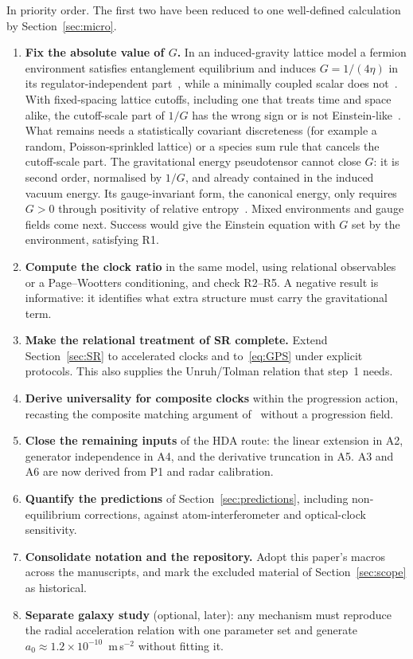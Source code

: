 \documentclass[11pt]{article}
\theoremstyle{plain}
\theoremstyle{definition}
\theoremstyle{remark}
\begin{document}
In priority order. The first two have been reduced to one well-defined calculation by Section~\ref{sec:micro}.

\begin{enumerate}[1.]
\item \textbf{Fix the absolute value of $G$.} In an induced-gravity lattice model a fermion environment satisfies entanglement equilibrium and induces $G=1/(4\eta)$ in its regulator-independent part~\cite{JordanNote6}, while a minimally coupled scalar does not~\cite{JordanNote5}. With fixed-spacing lattice cutoffs, including one that treats time and space alike, the cutoff-scale part of $1/G$ has the wrong sign or is not Einstein-like~\cite{JordanNote7,JordanNote8}. What remains needs a statistically covariant discreteness (for example a random, Poisson-sprinkled lattice) or a species sum rule that cancels the cutoff-scale part. The gravitational energy pseudotensor cannot close $G$: it is second order, normalised by $1/G$, and already contained in the induced vacuum energy. Its gauge-invariant form, the canonical energy, only requires $G>0$ through positivity of relative entropy~\cite{JordanNote11}. Mixed environments and gauge fields come next. Success would give the Einstein equation with $G$ set by the environment, satisfying R1.
\item \textbf{Compute the clock ratio} in the same model, using relational observables or a Page--Wootters conditioning, and check R2--R5. A negative result is informative: it identifies what extra structure must carry the gravitational term.
\item \textbf{Make the relational treatment of SR complete.} Extend Section~\ref{sec:SR} to accelerated clocks and to~\eqref{eq:GPS} under explicit protocols. This also supplies the Unruh/Tolman relation that step~1 needs.
\item \textbf{Derive universality for composite clocks} within the progression action, recasting the composite matching argument of~\cite{JordanLoading} without a progression field.
\item \textbf{Close the remaining inputs} of the HDA route: the linear extension in A2, generator independence in A4, and the derivative truncation in A5. A3 and A6 are now derived from P1 and radar calibration.
\item \textbf{Quantify the predictions} of Section~\ref{sec:predictions}, including non-equilibrium corrections, against atom-interferometer and optical-clock sensitivity.
\item \textbf{Consolidate notation and the repository.} Adopt this paper's macros across the manuscripts, and mark the excluded material of Section~\ref{sec:scope} as historical.
\item \textbf{Separate galaxy study} (optional, later): any mechanism must reproduce the radial acceleration relation with one parameter set and generate $a_0\approx1.2\times10^{-10}$~m\,s$^{-2}$ without fitting it.
\end{enumerate}
\end{document}
